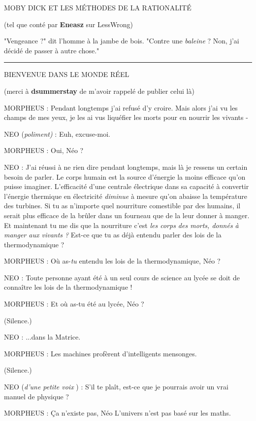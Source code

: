 \begin{center}MOBY DICK ET LES MÉTHODES DE LA RATIONALITÉ\end{center}



\begin{center}(tel que conté par \textbf{Eneasz}  sur LessWrong)\end{center}


"Vengeance ?" dit l'homme à la jambe de bois. "Contre une \emph{baleine}  ? Non, j'ai décidé de passer à autre chose."
\par\noindent\rule{\textwidth}{0.4pt}

\begin{center}BIENVENUE DANS LE MONDE RÉEL\end{center}



\begin{center}(merci à \textbf{dsummerstay}  de m'avoir rappelé de publier celui là)\end{center}


MORPHEUS : Pendant longtemps j'ai refusé d'y croire. Mais alors j'ai vu les champs de mes yeux, je les ai vus liquéfier les morts pour en nourrir les vivants -

NEO (\emph{poliment)}  : Euh, excuse-moi.

MORPHEUS : Oui, Néo ?

NEO : J'ai réussi à ne rien dire pendant longtemps, mais là je ressens un certain besoin de parler. Le corps humain est la source d'énergie la moins efficace qu'on puisse imaginer. L'efficacité d'une centrale électrique dans sa capacité à convertir l'énergie thermique en électricité \emph{diminue}  à mesure qu'on abaisse la température des turbines. Si tu as n'importe quel nourriture comestible par des humains, il serait plus efficace de la brûler dans un fourneau que de la leur donner à manger. Et maintenant tu me dis que la nourriture c'est \emph{les corps des morts, donnés à manger aux vivants ?}  Est-ce que tu as déjà entendu parler des lois de la thermodynamique ?

MORPHEUS : Où as-\emph{tu}  entendu les lois de la thermodynamique, Néo ?

NEO : Toute personne ayant été à un seul cours de science au lycée se doit de connaître les lois de la thermodynamique !

MORPHEUS : Et où as-tu été au lycée, Néo ?

(Silence.)

NEO : ...dans la Matrice.

MORPHEUS : Les machines profèrent d'intelligents mensonges.

(Silence.)

NEO (\emph{d'une petite voix} ) : S'il te plaît, est-ce que je pourrais avoir un vrai manuel de physique ?

MORPHEUS : Ça n'existe pas, Néo L'univers n'est pas basé sur les maths.

